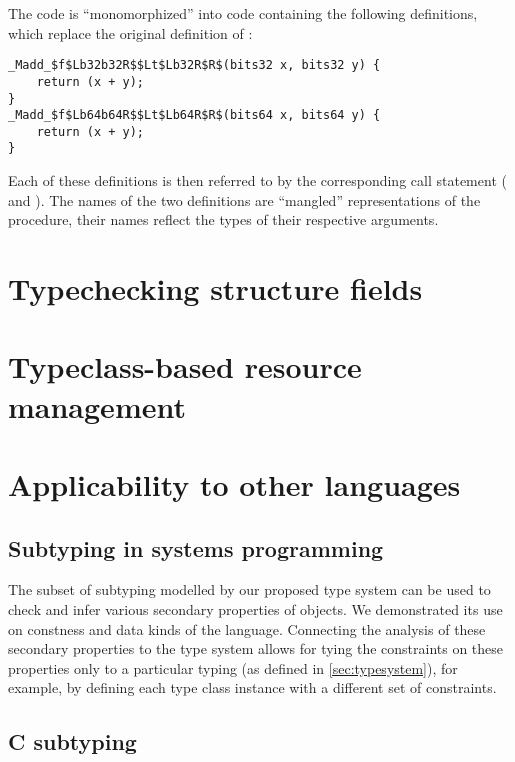 The code is ``monomorphized'' into code containing the following definitions, which replace the original definition of :

\begin{lstlisting}
_Madd_$f$Lb32b32R$$Lt$Lb32R$R$(bits32 x, bits32 y) {
    return (x + y);
}
_Madd_$f$Lb64b64R$$Lt$Lb64R$R$(bits64 x, bits64 y) {
    return (x + y);
}
\end{lstlisting}

Each of these definitions is then referred to by the corresponding call statement ( and ). The names of the two definitions are ``mangled'' representations of the  procedure, their names reflect the types of their respective arguments.

\section{Typechecking structure fields}




\section{Typeclass-based resource management}



\section{Applicability to other languages}



\subsection{Subtyping in systems programming}

The subset of subtyping modelled by our proposed type system can be used to check and infer various secondary properties of objects. We demonstrated its use on constness and data kinds of the \cmm{} language. Connecting the analysis of these secondary properties to the type system allows for tying the constraints on these properties only to a particular typing (as defined in \cref{sec:typesystem}), for example, by defining each type class instance with a different set of constraints.

\subsection{C subtyping}

